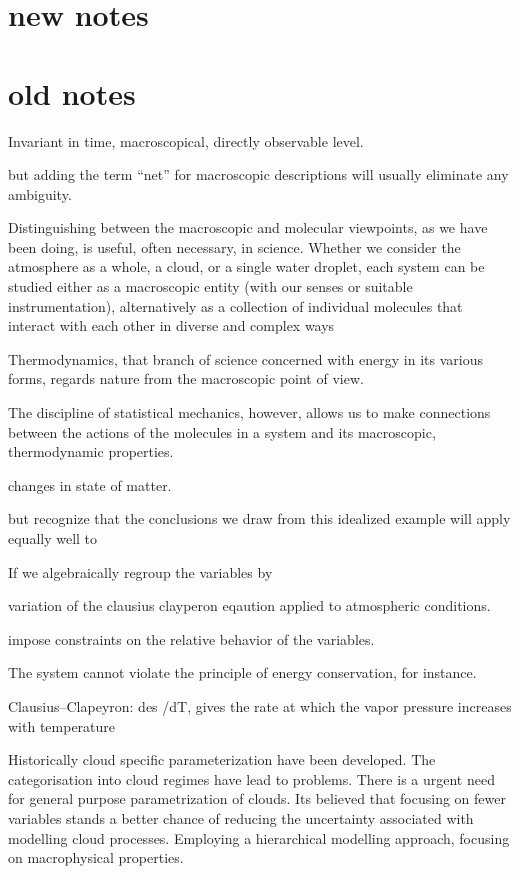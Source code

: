 \section{new notes}


\section{old notes }
Invariant in time, 
macroscopical, directly observable level.

but adding the term “net” for macroscopic descriptions will usually
eliminate any ambiguity.

Distinguishing between the macroscopic and molecular viewpoints, as we have been
doing, is useful, often necessary, in science. Whether we consider the atmosphere as a
whole, a cloud, or a single water droplet, each system can be studied either as a macroscopic
entity (with our senses or suitable instrumentation), alternatively as a collection of
individual molecules that interact with each other in diverse and complex ways

Thermodynamics, that branch of science concerned with energy in its various forms,
regards nature from the macroscopic point of view.

The discipline of statistical mechanics, however, allows us to make connections
between the actions of the molecules in a system and its macroscopic, thermodynamic
properties.

changes in state of matter.

but recognize that the
conclusions we draw from this idealized example will apply equally well to


If we algebraically regroup the variables by

variation of the clausius clayperon eqaution applied to atmospheric conditions.

impose constraints on the relative behavior of the variables.

The system cannot violate the principle of energy conservation, for instance.

Clausius–Clapeyron: des /dT, gives the rate at which the vapor pressure increases with temperature

Historically cloud specific parameterization have been developed. The categorisation into cloud regimes have lead to problems. There is a urgent need for general purpose parametrization of clouds. Its believed that focusing on fewer variables stands a better chance of reducing the uncertainty associated with modelling cloud processes. Employing a hierarchical modelling approach, focusing on macrophysical properties.

